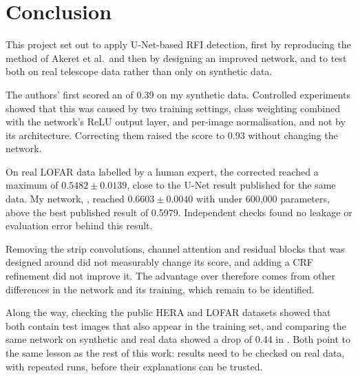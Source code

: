 \chapter{Conclusion}
\label{ch:conclusion}
This project set out to apply U-Net-based RFI detection, first by reproducing
the method of Akeret et al.\ and then by designing an improved network, and to
test both on real telescope data rather than only on synthetic data.

The authors' \tfunet{} first scored an \Fone{} of 0.39 on my synthetic data.
Controlled experiments showed that this was caused by two training settings,
class weighting combined with the network's ReLU output layer, and per-image
normalisation, and not by its architecture. Correcting them raised the score to
0.93 without changing the network.

On real LOFAR data labelled by a human expert, the corrected \tfunet{} reached
a maximum \Fone{} of $0.5482 \pm 0.0139$, close to the U-Net result published for
the same data. My network, \hybrid{}, reached $0.6603 \pm 0.0040$ with under
600{,}000 parameters, above the best published result of 0.5979. Independent
checks found no leakage or evaluation error behind this result.

Removing the strip convolutions, channel attention and residual blocks that
\hybrid{} was designed around did not measurably change its score, and adding
a CRF refinement did not improve it. The advantage over \tfunet{} therefore
comes from other differences in the network and its training, which remain to
be identified.

Along the way, checking the public HERA and LOFAR datasets showed that both
contain test images that also appear in the training set, and comparing the
same network on synthetic and real data showed a drop of 0.44 in \Fone{}. Both
point to the same lesson as the rest of this work: results need to be checked
on real data, with repeated runs, before their explanations can be trusted.
